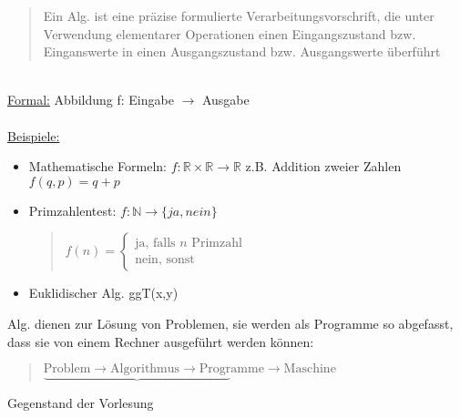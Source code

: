 \begin{quote}
Ein Alg. ist eine präzise formulierte Verarbeitungsvorschrift, die unter Verwendung elementarer Operationen einen Eingangszustand bzw. Einganswerte in einen Ausgangszustand bzw. Ausgangswerte überführt
\end{quote}
~\\
\underline{Formal:} Abbildung f: Eingabe $\rightarrow$ Ausgabe \\
~\\
\underline{Beispiele:}
\begin{itemize}
 \item Mathematische Formeln: $f: \mathbb{R} \times \mathbb{R} \rightarrow \mathbb{R}$ z.B. Addition zweier Zahlen $f(q,p) = q+p$
 \item Primzahlentest: $f: \mathbb{N} \rightarrow \{ ja, nein\}$ \\
  \begin{quote}
   $ f(n)=\left\{\begin{array}{cl}  \mbox{ja, falls }n \mbox{ Primzahl} \\ \mbox{nein, sonst} \end{array}\right. $
  \end{quote}
 \item  Euklidischer Alg.  ggT(x,y)
\end{itemize}
Alg. dienen zur Lösung von Problemen, sie werden als Programme so abgefasst, dass sie von einem Rechner ausgeführt werden können: \\
\begin{quote}
  $ \underbrace{\mbox{Problem} \rightarrow \mbox{Algorithmus} \rightarrow \mbox{Progr}}\mbox{amme} \rightarrow \mbox{Maschine} $
\end{quote}
Gegenstand der Vorlesung